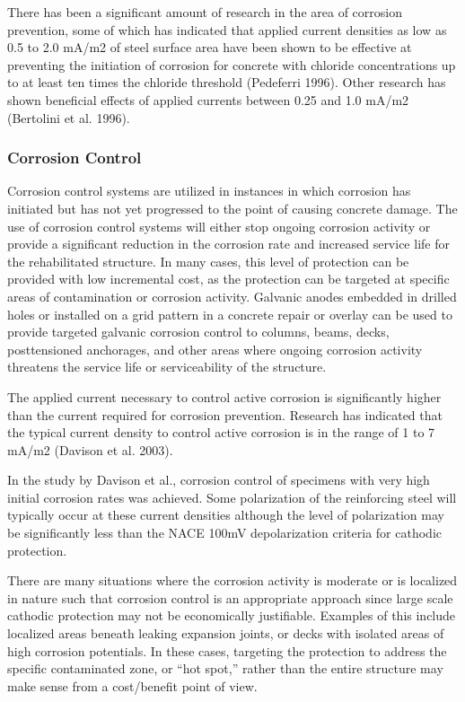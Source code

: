 There has been a significant amount of research in the area of corrosion prevention, some of which has indicated
that applied current densities as low as 0.5 to 2.0 mA/m2 of steel surface area have been shown to be effective at
preventing the initiation of corrosion for concrete with chloride concentrations up to at least ten times the chloride
threshold (Pedeferri 1996). Other research has shown beneficial effects of applied currents between 0.25 and 1.0
mA/m2 (Bertolini et al. 1996).


\subsubsection{Corrosion Control}

Corrosion control systems are utilized in instances in which corrosion has initiated but has not yet progressed to
the point of causing concrete damage. The use of corrosion control systems will either stop ongoing corrosion
activity or provide a significant reduction in the corrosion rate and increased service life for the rehabilitated
structure. In many cases, this level of protection can be provided with low incremental cost, as the protection can be
targeted at specific areas of contamination or corrosion activity. Galvanic anodes embedded in drilled holes or
installed on a grid pattern in a concrete repair or overlay can be used to provide targeted galvanic corrosion control to columns, beams, decks, posttensioned anchorages, and other areas where ongoing corrosion activity threatens the
service life or serviceability of the structure. 

The applied current necessary to control active corrosion is significantly higher than the current required for
corrosion prevention. Research has indicated that the typical current density to control active corrosion is in the
range of 1 to 7 mA/m2 (Davison et al. 2003).

In the study by Davison et al., corrosion control of specimens with very high initial corrosion rates was achieved.
Some polarization of the reinforcing steel will typically occur at these current densities although the level of
polarization may be significantly less than the NACE 100mV depolarization criteria for cathodic protection.

There are many situations where the corrosion activity is moderate or is localized in nature such that corrosion
control is an appropriate approach since large scale cathodic protection may not be economically justifiable.
Examples of this include localized areas beneath leaking expansion joints, or decks with isolated areas of high
corrosion potentials. In these cases, targeting the protection to address the specific contaminated zone, or “hot spot,”
rather than the entire structure may make sense from a cost/benefit point of view.



